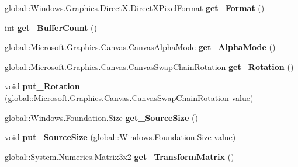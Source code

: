 \begin{DoxyCompactItemize}
global\+::\+Windows.\+Graphics.\+Direct\+X.\+Direct\+X\+Pixel\+Format {\bfseries get\+\_\+\+Format} ()
\item 
\mbox{\label{class_microsoft_1_1_graphics_1_1_canvas_1_1_canvas_swap_chain_a05dfa44260feee23c63d2eac46c23f70}} 
int {\bfseries get\+\_\+\+Buffer\+Count} ()
\item 
\mbox{\label{class_microsoft_1_1_graphics_1_1_canvas_1_1_canvas_swap_chain_ad8c5508e9f2dd8f46844e5f8ffe4c88c}} 
global\+::\+Microsoft.\+Graphics.\+Canvas.\+Canvas\+Alpha\+Mode {\bfseries get\+\_\+\+Alpha\+Mode} ()
\item 
\mbox{\label{class_microsoft_1_1_graphics_1_1_canvas_1_1_canvas_swap_chain_a38d2edc13ed46c7738d08befe493fe6a}} 
global\+::\+Microsoft.\+Graphics.\+Canvas.\+Canvas\+Swap\+Chain\+Rotation {\bfseries get\+\_\+\+Rotation} ()
\item 
\mbox{\label{class_microsoft_1_1_graphics_1_1_canvas_1_1_canvas_swap_chain_aa79e0223f31c2d8340106d62234e5b0c}} 
void {\bfseries put\+\_\+\+Rotation} (global\+::\+Microsoft.\+Graphics.\+Canvas.\+Canvas\+Swap\+Chain\+Rotation value)
\item 
\mbox{\label{class_microsoft_1_1_graphics_1_1_canvas_1_1_canvas_swap_chain_afca955eaf0e973eaaeb91c98e88ef9ca}} 
global\+::\+Windows.\+Foundation.\+Size {\bfseries get\+\_\+\+Source\+Size} ()
\item 
\mbox{\label{class_microsoft_1_1_graphics_1_1_canvas_1_1_canvas_swap_chain_a4bbf3093ffb9df4537ddd6915a3dd36a}} 
void {\bfseries put\+\_\+\+Source\+Size} (global\+::\+Windows.\+Foundation.\+Size value)
\item 
\mbox{\label{class_microsoft_1_1_graphics_1_1_canvas_1_1_canvas_swap_chain_a034b992fbfdeb8095e67722a392be5a3}} 
global\+::\+System.\+Numerics.\+Matrix3x2 {\bfseries get\+\_\+\+Transform\+Matrix} ()

\end{DoxyCompactItemize}
